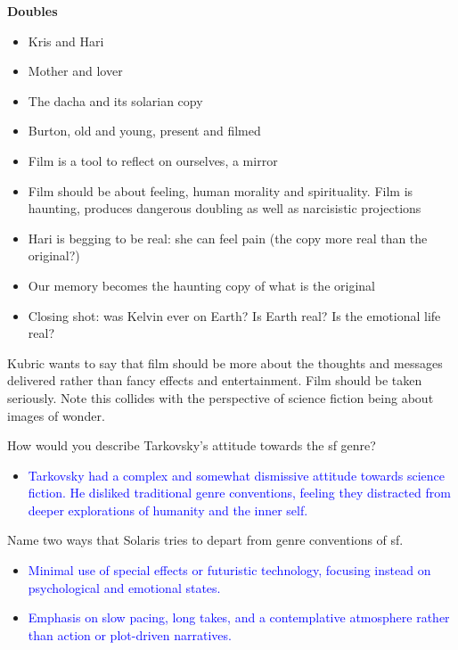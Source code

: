 \documentclass[11pt,fleqn]{book}
\begin{document}
\textbf{Doubles}
\begin{itemize}
    \item Kris and Hari
    \item Mother and lover 
    \item The dacha and its solarian copy
    \item Burton, old and young, present and filmed
    \item Film is a tool to reflect on ourselves, a mirror
    \item Film should be about feeling, human morality and spirituality. Film is haunting, produces dangerous doubling as well as narcisistic projections
    \item Hari is begging to be real: she can feel pain (the copy more real than the original?)
    \item Our memory becomes the haunting copy of what is the original
    \item Closing shot: was Kelvin ever on Earth? Is Earth real? Is the emotional life real?
\end{itemize}
\begin{remark}
    Kubric wants to say that film should be more about the thoughts and messages delivered rather than fancy effects and entertainment. Film should be taken seriously. Note this collides with the perspective of science fiction being about images of wonder.
\end{remark}
\begin{exercise}
How would you describe Tarkovsky's attitude towards the sf genre?
\begin{itemize}
\item \textcolor{blue}{Tarkovsky had a complex and somewhat dismissive attitude towards science fiction. He disliked traditional genre conventions, feeling they distracted from  deeper explorations of humanity and the inner self.}
\end{itemize}
\end{exercise}

\begin{exercise}
Name two ways that Solaris tries to depart from genre conventions of sf.
\begin{itemize}
\item \textcolor{blue}{Minimal use of special effects or futuristic technology,  focusing instead on psychological and emotional states.}
\item \textcolor{blue}{Emphasis on slow pacing, long takes, and a contemplative atmosphere rather than action or plot-driven narratives.}
\end{itemize}
\end{exercise}
\end{document}
